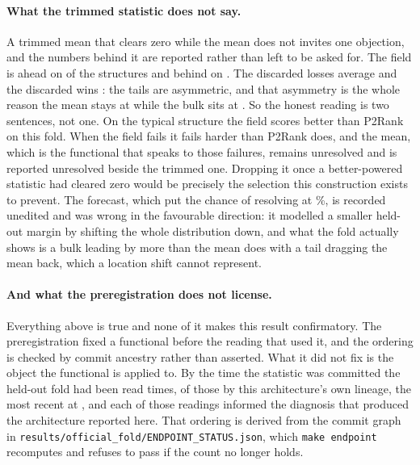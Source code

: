 \documentclass[11pt]{article}
\begin{document}
\paragraph{What the trimmed statistic does not say.} A trimmed mean that clears
zero while the mean does not invites one objection, and the numbers behind it
are reported rather than left to be asked for. The field is ahead on
\PreRegNAhead{} of the \NUnits{} structures and behind on
\PreRegNBehind{}. The \PreRegNTrimmed{} discarded losses average
\PreRegTailLoss{} and the \PreRegNTrimmed{} discarded wins \PreRegTailWin{}: the
tails are asymmetric, and that asymmetry is the whole reason the mean stays at
\TabAucD{} while the bulk sits at \PreRegTestDelta{}. So the honest reading is
two sentences, not one. On the typical structure the field scores better than
P2Rank on this fold. When the field fails it fails harder
than P2Rank does, and the mean, which is the functional that speaks to those
failures, remains unresolved and is reported unresolved beside the trimmed one.
Dropping it once a better-powered statistic had cleared zero would be precisely
the selection this construction exists to prevent. The forecast, which put the
chance of resolving at \PreRegForecast{}\%, is recorded unedited and was wrong
in the favourable direction: it modelled a smaller held-out margin by shifting
the whole distribution down, and what the fold actually shows is a bulk leading
by more than the mean does with a tail dragging the mean back, which a location
shift cannot represent.

\paragraph{And what the preregistration does not license.}
\label{sec:endpoints}
Everything above is true and none of it makes this result confirmatory. The
preregistration fixed a functional before the reading that used it, and the
ordering is checked by commit ancestry rather than asserted. What it did not fix
is the object the functional is applied to. By the time the statistic was
committed the held-out fold had been read \EndReadsBefore{} times,
\EndLineageBefore{} of those by this architecture's own lineage, the most recent
at \EndPriorBestAuc{}, and each of those readings informed the diagnosis that
produced the architecture reported here. That ordering is derived from the commit
graph in \texttt{results/official\_fold/ENDPOINT\_STATUS.json}, which \texttt{make
endpoint} recomputes and refuses to pass if the count no longer holds.
\end{document}
